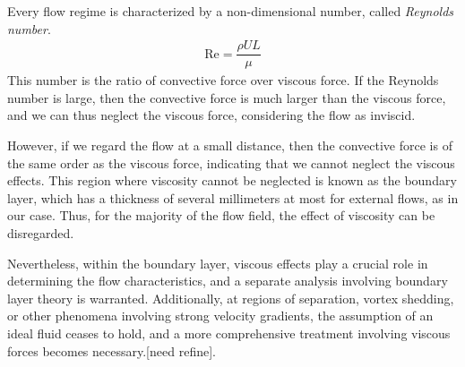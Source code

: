 \documentclass[a4paper, 12pt]{book}
\begin{document}
\begin{article}
    Every flow regime is characterized by a non-dimensional number, called \emph{Reynolds number}.
    \begin{align}
        \text{Re} = \dfrac{\rho U L}{\mu}
    \end{align}
    This number is the ratio of convective force over viscous force. If the Reynolds number is large, then the convective force is much larger than the viscous force, and we can thus neglect the viscous force, considering the flow as inviscid. 

    However, if we regard the flow at a small distance, then the convective force is of the same order as the viscous force, indicating that we cannot neglect the viscous effects. This region where viscosity cannot be neglected is known as the boundary layer, which has a thickness of several millimeters at most for external flows, as in our case. Thus, for the majority of the flow field, the effect of viscosity can be disregarded.

    Nevertheless, within the boundary layer, viscous effects play a crucial role in determining the flow characteristics, and a separate analysis involving boundary layer theory is warranted. Additionally, at regions of separation, vortex shedding, or other phenomena involving strong velocity gradients, the assumption of an ideal fluid ceases to hold, and a more comprehensive treatment involving viscous forces becomes necessary.[need refine].
\end{article}

\begin{article}
    
\end{article}


\end{document}
